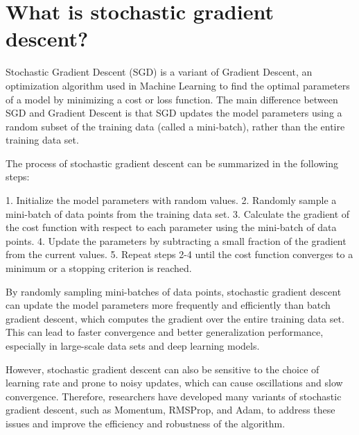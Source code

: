 \section{What is stochastic gradient descent?}
Stochastic Gradient Descent (SGD) is a variant of Gradient Descent, an optimization algorithm used in Machine Learning to find the optimal parameters of a model by minimizing a cost or loss function. The main difference between SGD and Gradient Descent is that SGD updates the model parameters using a random subset of the training data (called a mini-batch), rather than the entire training data set.

The process of stochastic gradient descent can be summarized in the following steps:

1. Initialize the model parameters with random values.
2. Randomly sample a mini-batch of data points from the training data set.
3. Calculate the gradient of the cost function with respect to each parameter using the mini-batch of data points.
4. Update the parameters by subtracting a small fraction of the gradient from the current values.
5. Repeat steps 2-4 until the cost function converges to a minimum or a stopping criterion is reached.

By randomly sampling mini-batches of data points, stochastic gradient descent can update the model parameters more frequently and efficiently than batch gradient descent, which computes the gradient over the entire training data set. This can lead to faster convergence and better generalization performance, especially in large-scale data sets and deep learning models.

However, stochastic gradient descent can also be sensitive to the choice of learning rate and prone to noisy updates, which can cause oscillations and slow convergence. Therefore, researchers have developed many variants of stochastic gradient descent, such as Momentum, RMSProp, and Adam, to address these issues and improve the efficiency and robustness of the algorithm.

